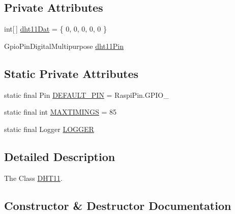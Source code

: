 \subsection*{Private Attributes}
\begin{DoxyCompactItemize}
\item 
int\mbox{[}$\,$\mbox{]} \hyperlink{classcom_1_1libsensorj_1_1concretesensor_1_1DHT11_ae5a787d251b155afe8aa366d3cd3d7b3}{dht11\+Dat} = \{ 0, 0, 0, 0, 0 \}
\item 
Gpio\+Pin\+Digital\+Multipurpose \hyperlink{classcom_1_1libsensorj_1_1concretesensor_1_1DHT11_a816e6c7ffc2d313077cc5df4b2252b41}{dht11\+Pin}
\end{DoxyCompactItemize}
\subsection*{Static Private Attributes}
\begin{DoxyCompactItemize}
\item 
static final Pin \hyperlink{classcom_1_1libsensorj_1_1concretesensor_1_1DHT11_a90e62e8cc61299199eb1fa06bd441a9e}{D\+E\+F\+A\+U\+L\+T\+\_\+\+P\+I\+N} = Raspi\+Pin.\+G\+P\+I\+O\+\_
\item 
static final int \hyperlink{classcom_1_1libsensorj_1_1concretesensor_1_1DHT11_ad986e37718b89038ff2702c80a2bb320}{M\+A\+X\+T\+I\+M\+I\+N\+G\+S} = 85
\item 
static final Logger \hyperlink{classcom_1_1libsensorj_1_1concretesensor_1_1DHT11_ad5b8d7e0ad34e4f3b28c081f259d1928}{L\+O\+G\+G\+E\+R}
\end{DoxyCompactItemize}


\subsection{Detailed Description}
The Class \hyperlink{classcom_1_1libsensorj_1_1concretesensor_1_1DHT11}{D\+H\+T11}. 

\subsection{Constructor \& Destructor Documentation}
\hypertarget{classcom_1_1libsensorj_1_1concretesensor_1_1DHT11_a6dee6dabad63a5b8f8ba35f1279703c2}{}
